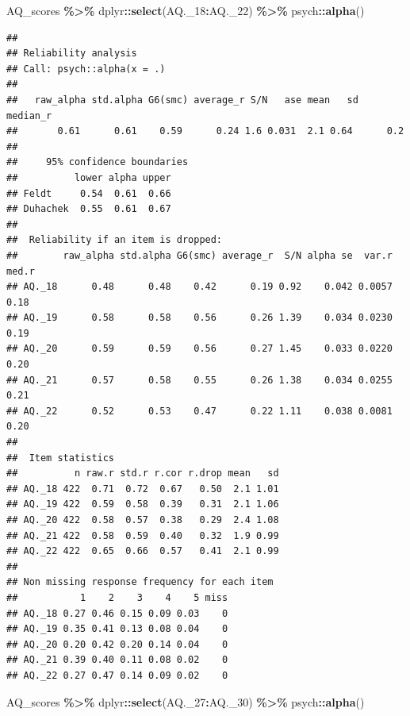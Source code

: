 \documentclass[
]{article}
\newenvironment{Shaded}{\begin{snugshade}}{\end{snugshade}}
\newcommand{\FunctionTok}[1]{\textcolor[rgb]{0.13,0.29,0.53}{\textbf{#1}}}
\newcommand{\NormalTok}[1]{#1}
\newcommand{\SpecialCharTok}[1]{\textcolor[rgb]{0.81,0.36,0.00}{\textbf{#1}}}
\begin{document}
\begin{Shaded}
\begin{Highlighting}[]
\NormalTok{AQ\_scores }\SpecialCharTok{\%\textgreater{}\%}\NormalTok{ dplyr}\SpecialCharTok{::}\FunctionTok{select}\NormalTok{(AQ.\_18}\SpecialCharTok{:}\NormalTok{AQ.\_22) }\SpecialCharTok{\%\textgreater{}\%}\NormalTok{ psych}\SpecialCharTok{::}\FunctionTok{alpha}\NormalTok{()}
\end{Highlighting}
\end{Shaded}

\begin{verbatim}
## 
## Reliability analysis   
## Call: psych::alpha(x = .)
## 
##   raw_alpha std.alpha G6(smc) average_r S/N   ase mean   sd median_r
##       0.61      0.61    0.59      0.24 1.6 0.031  2.1 0.64      0.2
## 
##     95% confidence boundaries 
##          lower alpha upper
## Feldt     0.54  0.61  0.66
## Duhachek  0.55  0.61  0.67
## 
##  Reliability if an item is dropped:
##        raw_alpha std.alpha G6(smc) average_r  S/N alpha se  var.r med.r
## AQ._18      0.48      0.48    0.42      0.19 0.92    0.042 0.0057  0.18
## AQ._19      0.58      0.58    0.56      0.26 1.39    0.034 0.0230  0.19
## AQ._20      0.59      0.59    0.56      0.27 1.45    0.033 0.0220  0.20
## AQ._21      0.57      0.58    0.55      0.26 1.38    0.034 0.0255  0.21
## AQ._22      0.52      0.53    0.47      0.22 1.11    0.038 0.0081  0.20
## 
##  Item statistics 
##          n raw.r std.r r.cor r.drop mean   sd
## AQ._18 422  0.71  0.72  0.67   0.50  2.1 1.01
## AQ._19 422  0.59  0.58  0.39   0.31  2.1 1.06
## AQ._20 422  0.58  0.57  0.38   0.29  2.4 1.08
## AQ._21 422  0.58  0.59  0.40   0.32  1.9 0.99
## AQ._22 422  0.65  0.66  0.57   0.41  2.1 0.99
## 
## Non missing response frequency for each item
##           1    2    3    4    5 miss
## AQ._18 0.27 0.46 0.15 0.09 0.03    0
## AQ._19 0.35 0.41 0.13 0.08 0.04    0
## AQ._20 0.20 0.42 0.20 0.14 0.04    0
## AQ._21 0.39 0.40 0.11 0.08 0.02    0
## AQ._22 0.27 0.47 0.14 0.09 0.02    0
\end{verbatim}

\begin{Shaded}
\begin{Highlighting}[]
\NormalTok{AQ\_scores }\SpecialCharTok{\%\textgreater{}\%}\NormalTok{ dplyr}\SpecialCharTok{::}\FunctionTok{select}\NormalTok{(AQ.\_27}\SpecialCharTok{:}\NormalTok{AQ.\_30) }\SpecialCharTok{\%\textgreater{}\%}\NormalTok{ psych}\SpecialCharTok{::}\FunctionTok{alpha}\NormalTok{()}
\end{Highlighting}
\end{Shaded}
\end{document}
